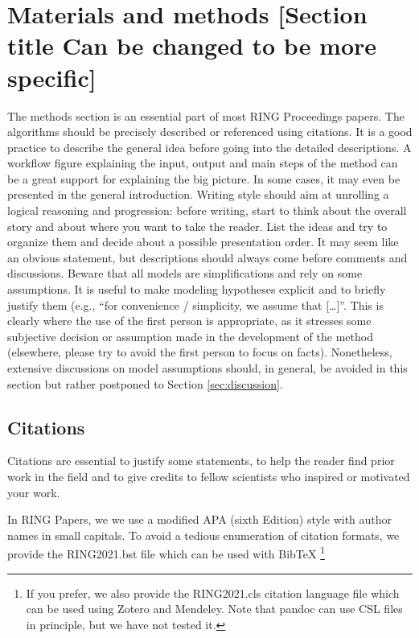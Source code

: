 \documentclass[final]{ring}
\begin{document}
\section{Materials and methods [Section title Can be changed to be more specific]}
\label{Method}

The methods section is an essential part of most RING Proceedings papers. The algorithms should be precisely described or referenced using citations. It is a good practice to describe the general idea before going into the detailed descriptions. A workflow figure explaining the input, output and main steps of the method can be a great support for explaining the big picture. In some cases, it may even be presented in the general introduction. 
Writing style should aim at unrolling a logical reasoning and progression: before writing, start to think about the overall story and about where you want to take the reader. List the ideas and try to organize them and decide about a possible presentation order. It may seem like an obvious statement, but descriptions should always come before comments and discussions. Beware that all models are simplifications and rely on some assumptions. It is useful to make modeling hypotheses explicit and to briefly justify them (e.g., ``for convenience / simplicity, we assume that […]''. This is clearly where the use of the first person is appropriate, as it stresses some subjective decision or assumption made in the development of the method (elsewhere, please try to avoid the first person to focus on facts). Nonetheless, extensive discussions on model assumptions should, in general, be avoided in this section but rather postponed to Section \ref{sec:discussion}.

\subsection{Citations}

Citations are essential to justify some statements, to help the reader find prior work in the field and to give credits to fellow scientists who inspired or motivated your work. 

In RING Papers, we we use a modified APA (sixth Edition) style with author names in small capitals. To avoid a tedious enumeration of citation formats, we provide the RING2021.bst file which can be used with BibTeX \footnote{If you prefer, we also provide the RING2021.cls citation language file which can be used using Zotero and Mendeley. Note that pandoc can use CSL files in principle, but we have not tested it.}
\end{document}
